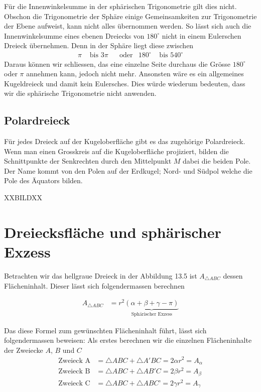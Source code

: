 \begin{refsection}
Für die Innenwinkelsumme in der sphärischen Trigonometrie gilt dies nicht. Obschon die Trigonometrie der Sphäre einige Gemeinsamkeiten zur Trigonometrie der Ebene aufweist, kann nicht alles übernommen werden.
So lässt sich auch die Innenwinkelsumme eines ebenen Dreiecks von $180^{\circ}$ nicht in einem Eulerschen Dreieck übernehmen.
Denn in der Sphäre liegt diese zwischen
\[
\begin{aligned}
\pi
&\text{ bis }
3\pi
&
&\text{oder}
&
180^{\circ}
&\text{ bis }
540^{\circ}
\end{aligned}
\]
Daraus können wir schliessen, das eine einzelne Seite durchaus die Grösse $180^{\circ}$ oder $\pi$ annehmen kann, jedoch nicht mehr. Ansonsten wäre es ein allgemeines Kugeldreieck und damit kein Eulersches. Dies würde wiederum bedeuten, dass wir die sphärische Trigonometrie nicht anwenden.


\subsection{Polardreieck}
Für jedes Dreieck auf der Kugeloberfläche gibt es das zugehörige Polardreieck. Wenn man einen Grosskreis auf die Kugeloberfläche projiziert, bilden die Schnittpunkte der Senkrechten durch den Mittelpunkt $M$ dabei die beiden Pole. 
Der Name kommt von den Polen auf der Erdkugel; Nord- und Südpol welche die Pole des Äquators bilden.

XXBILDXX




\section{Dreiecksfläche und sphärischer Exzess} \label{Flaeche}
Betrachten wir das hellgraue Dreieck in der Abbildung 13.5 ist $A_{ \triangle{ ABC }}$ dessen Flächeninhalt. Dieser lässt sich folgendermassen berechnen

\begin{align*}
A_{ \triangle{ ABC }}  &= r^{ 2 }\underbrace{(\alpha + \beta + \gamma - \pi)}_{\text{Sphärischer Exzess}}
\end{align*}

Das diese Formel zum gewünschten Flächeninhalt führt, lässt sich folgendermassen beweisen:
Als erstes berechnen wir die einzelnen Flächeninhalte der Zweiecke $A$, $B$ und $C$
\begin{align*}
\text{Zweieck A}
&=
\triangle{ABC} + \triangle{A'BC} = 2 \alpha r^{ 2 } = A_{ \alpha }\\
\text{Zweieck B}
&=
\triangle{ABC} + \triangle{AB'C} = 2 \beta r^{ 2 } = A_{ \beta }\\
\text{Zweieck C}
&=
\triangle{ABC} + \triangle{ABC’} = 2 \gamma r^{ 2 } = A_{ \gamma }
\end{align*}


\end{refsection}
